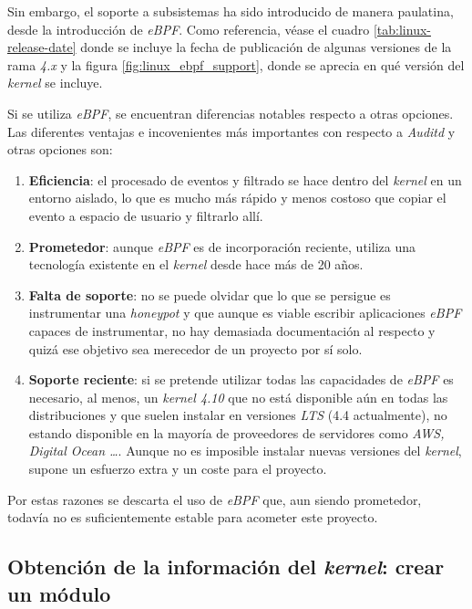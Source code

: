 Sin embargo, el soporte a subsistemas ha sido introducido de manera paulatina, desde la introducción de \emph{eBPF}. Como referencia, véase el cuadro \ref{tab:linux-release-date} donde se incluye la fecha de publicación de algunas versiones de la rama
\emph{4.x} y la figura \ref{fig:linux_ebpf_support}, donde se aprecia en qué versión del \emph{kernel} se incluye.

\clearpage


Si se utiliza \emph{eBPF}, se encuentran diferencias notables respecto a otras opciones. Las diferentes ventajas e incovenientes más importantes con respecto a \emph{Auditd} y otras opciones son:
\begin{enumerate}
    \item \textbf{Eficiencia}: el procesado de eventos y filtrado se hace dentro del \emph{kernel} en un entorno aislado, lo que es mucho más
    rápido y menos costoso que copiar el evento a espacio de usuario y filtrarlo allí.
    \item \textbf{Prometedor}: aunque \emph{eBPF} es de incorporación reciente, utiliza una tecnología existente en el \emph{kernel} desde hace más de 20 años.
    \item \textbf{Falta de soporte}: no se puede olvidar que lo que se persigue es instrumentar una \emph{honeypot} y que aunque es viable escribir aplicaciones \emph{eBPF} capaces de instrumentar, no hay demasiada documentación al respecto
    y quizá ese objetivo sea merecedor de un proyecto por sí solo.
    \item \textbf{Soporte reciente}: si se pretende utilizar todas las capacidades de \emph{eBPF} es necesario, al menos, un \emph{kernel 4.10} que no está disponible aún en todas las distribuciones y que suelen instalar en
    versiones \emph{LTS} (4.4 actualmente), no estando disponible en la mayoría de proveedores de servidores como \emph{AWS, Digital Ocean \ldots}. Aunque no es imposible instalar nuevas versiones del \emph{kernel},
    supone un esfuerzo extra y un coste para el proyecto.
\end{enumerate}

Por estas razones se descarta el uso de \emph{eBPF} que, aun siendo prometedor, todavía no es suficientemente estable para acometer este proyecto.

\subsection{Obtención de la información del \emph{kernel}: crear un módulo}
\label{subsec:kernel-modulo}

